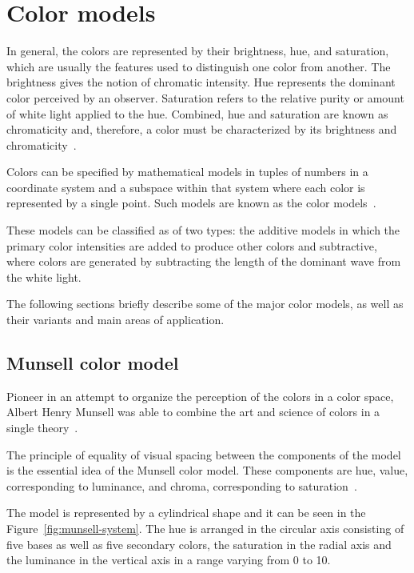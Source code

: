 \section{Color models}
\label{sec:color_models}

In general, the colors are represented by their brightness, hue, and saturation, which are usually the features used to distinguish one color from another. The brightness gives the notion of chromatic intensity. Hue represents the dominant color perceived by an observer. Saturation refers to the relative purity or amount of white light applied to the hue. Combined, hue and saturation are known as chromaticity and, therefore, a color must be characterized by its brightness and chromaticity~\citep{gonzalez:02}.

Colors can be specified by mathematical models in tuples of numbers in a coordinate system and a subspace within that system where each color is represented by a single point. Such models are known as the color models~\citep{gonzalez:02}.

These models can be classified as of two types: the additive models in which the primary color intensities are added to produce other colors and subtractive, where colors are generated by subtracting the length of the dominant wave from the white light.

The following sections briefly describe some of the major color models, as well as their variants and main areas of application.

\subsection{Munsell color model}
\label{sec:modelo_cores_munsell}

Pioneer in an attempt to organize the perception of the colors in a color space, Albert Henry Munsell was able to combine the art and science of colors in a single theory~\citep{konstantinos:00}.

The principle of equality of visual spacing between the components of the model is the essential idea of the Munsell color model. These components are hue, value, corresponding to luminance, and chroma, corresponding to saturation~\citep{konstantinos:00}.

The model is represented by a cylindrical shape and it can be seen in the Figure~\ref{fig:munsell-system}. The hue is arranged in the circular axis consisting of five bases as well as five secondary colors, the saturation in the radial axis and the luminance in the vertical axis in a range varying from 0 to 10.


